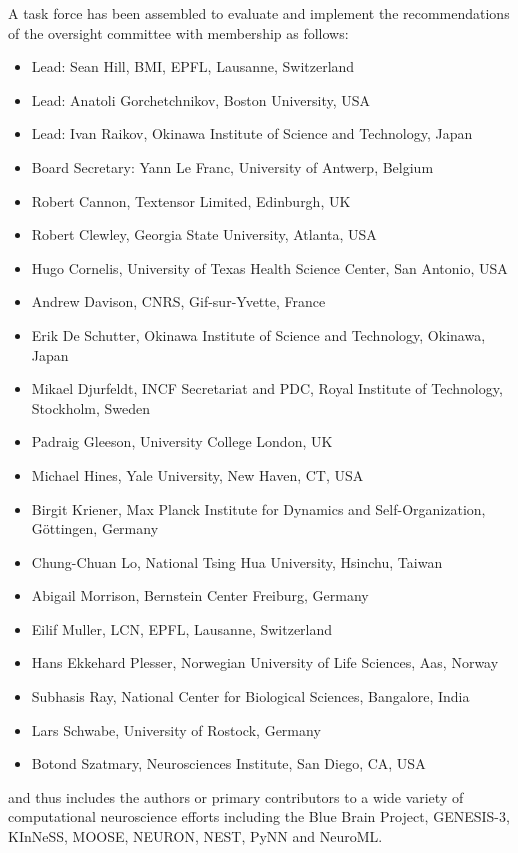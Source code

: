 \documentclass{article}
\begin{document}
A task force has been assembled to evaluate and implement the
recommendations of the oversight committee with membership as follows:

\begin{itemize}
    \item Lead: Sean Hill, BMI, EPFL, Lausanne, Switzerland
    \item Lead: Anatoli Gorchetchnikov, Boston University, USA
    \item Lead: Ivan Raikov, Okinawa Institute of Science and Technology, Japan
    \item Board Secretary: Yann Le Franc, University of Antwerp, Belgium
    \item Robert Cannon, Textensor Limited, Edinburgh, UK
    \item Robert Clewley, Georgia State University, Atlanta, USA
    \item Hugo Cornelis, University of Texas Health Science Center, San Antonio, USA
    \item Andrew Davison, CNRS, Gif-sur-Yvette, France
    \item Erik De Schutter, Okinawa Institute of Science and Technology, Okinawa, Japan
    \item Mikael Djurfeldt, INCF Secretariat and PDC,
Royal Institute of Technology, Stockholm, Sweden
    \item Padraig Gleeson, University College London, UK
    \item Michael Hines, Yale University, New Haven, CT, USA
    \item Birgit Kriener, Max Planck Institute for Dynamics and Self-Organization,
Göttingen, Germany
    \item Chung-Chuan Lo, National Tsing Hua University, Hsinchu, Taiwan
    \item Abigail Morrison, Bernstein Center Freiburg, Germany
    \item Eilif Muller, LCN, EPFL, Lausanne, Switzerland
    \item Hans Ekkehard Plesser, Norwegian University of Life Sciences, Aas, Norway
    \item Subhasis Ray, National Center for Biological Sciences, Bangalore, India
    \item Lars Schwabe, University of Rostock, Germany
    \item Botond Szatmary, Neurosciences Institute, San Diego, CA, USA

\end{itemize}

and thus includes the authors or primary contributors to a wide
variety of computational neuroscience efforts including the Blue Brain
Project, GENESIS-3, KInNeSS, MOOSE, NEURON, NEST, PyNN and NeuroML.


%
\end{document}
